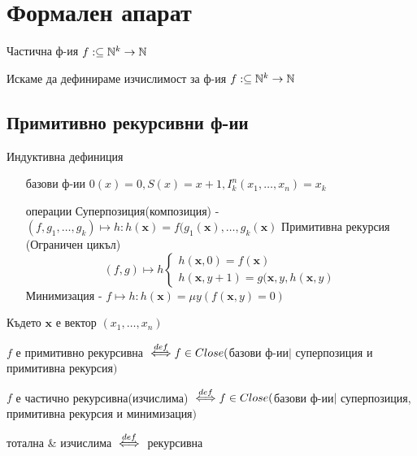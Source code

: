 \section{Формален апарат}
\begin{notation}
    Частична ф-ия $f: \subseteq {\mathbb{N}}^k \to {\mathbb{N}}$
\end{notation}
Искаме да дефинираме изчислимост за ф-ия $f: \subseteq {\mathbb{N}}^k \to {\mathbb{N}}$

\subsection{Примитивно рекурсивни ф-ии}
\begin{definition}
    Индуктивна дефиниция
    \begin{itemize}
        \item[базови ф-ии] $0(x) = 0, S(x) = x+1, I_k^n(x_1,\dots, x_n) = x_k$
        \item[операции] 
            \subitem Суперпозиция(композиция) - $(f, g_1, \dots, g_k) \mapsto h : h(\mathbf{x}) = f(g_1(\textbf{x}), \dots, g_k(\textbf{x})$
            \subitem Примитивна рекурсия (Ограничен цикъл)
            \begin{equation}
            (f, g) \mapsto h
                \begin{cases}
                    h(\textbf{x}, 0) = f(\textbf{x})\\
                    h(\textbf{x}, y+1) = g(\textbf{x}, y, h(\textbf{x}, y)
                \end{cases}
            \end{equation}
            \subitem Минимизация - $f \mapsto h : h(\textbf{x}) = \mu y(f(\textbf{x}, y) = 0)$
    \end{itemize}
    Където $\textbf{x}$ е вектор $(x_1, \dots, x_n)$

    $f$ е примитивно рекурсивна ${\overset{def}{\iff}} f\in Close($базови ф-ии$ \mid $ суперпозиция и примитивна рекурсия$)$ 
\end{definition}
\begin{definition}
    $f$ е частично рекурсивна(изчислима) ${\overset{def}{\iff}} f\in Close($базови ф-ии$ \mid $ суперпозиция, примитивна рекурсия и минимизация$)$ 
\end{definition}
\begin{definition}
    тотална \& изчислима ${\overset{def}{\iff}}$ рекурсивна
\end{definition}

